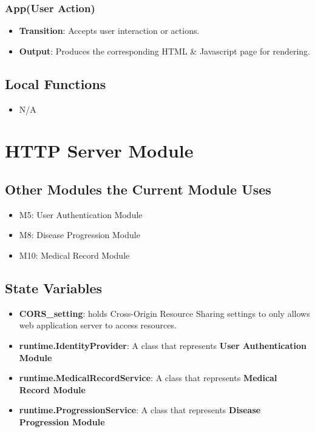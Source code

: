 \documentclass[12pt, titlepage]{article}
\begin{document}
\subsubsection{App(User Action)}
\begin{itemize}
  \item \textbf{Transition}: Accepts user interaction or actions.
  \item \textbf{Output}: Produces the corresponding HTML \& Javascript page for rendering.
\end{itemize}

\subsection{Local Functions}
\begin{itemize}
\item N/A
\end{itemize}

\section{HTTP Server Module}

\subsection{Other Modules the Current Module Uses}
\begin{itemize}
  \item M5: User Authentication Module
  \item M8: Disease Progression Module
  \item M10: Medical Record Module
\end{itemize}

\subsection{State Variables}
\begin{itemize}
    \item \textbf{CORS\_setting}: holds Cross-Origin Resource Sharing settings to only allows web application server to access resources. 
    \item \textbf{runtime.IdentityProvider}: A class that represents \textbf{User Authentication Module}
    \item \textbf{runtime.MedicalRecordService}: A class that represents \textbf{Medical Record Module}
    \item \textbf{runtime.ProgressionService}: A class that represents \textbf{Disease Progression Module}
\end{itemize}
\end{document}
